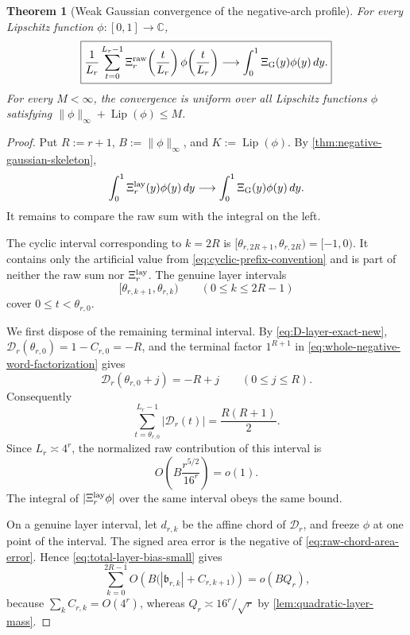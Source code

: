 \documentclass[11pt]{article}
\newtheorem{theorem}{Theorem}[section]
\theoremstyle{definition}
\theoremstyle{remark}
\begin{document}
\begin{theorem}[Weak Gaussian convergence of the negative-arch profile]
\label{thm:weak-gaussian-full-profile}
For every Lipschitz function \(\phi:[0,1]\to\mathbb C\),
\begin{equation}
 \boxed{
 \frac1{L_r}\sum_{t=0}^{L_r-1}
 \Xi_r^{\rm raw}\!\left(\frac{t}{L_r}\right)
 \phi\!\left(\frac{t}{L_r}\right)
 \longrightarrow
 \int_0^1\Xi_{\rm G}(y)\phi(y)\,dy.
 }
 \label{eq:weak-gaussian-test}
\end{equation}
For every \(M<\infty\), the convergence is uniform over all Lipschitz
functions \(\phi\) satisfying
\(\|\phi\|_\infty+\operatorname{Lip}(\phi)\le M\).
\end{theorem}

\begin{proof}
Put \(R:=r+1\), \(B:=\|\phi\|_\infty\), and
\(K:=\operatorname{Lip}(\phi)\).  By
\cref{thm:negative-gaussian-skeleton},
\[
 \int_0^1\Xi_r^{\rm lay}(y)\phi(y)\,dy
 \longrightarrow
 \int_0^1\Xi_{\rm G}(y)\phi(y)\,dy.
\]
It remains to compare the raw sum with the integral on the left.

The cyclic interval corresponding to \(k=2R\) is
\([\theta_{r,2R+1},\theta_{r,2R})=[-1,0)\).  It contains only the artificial
value from \eqref{eq:cyclic-prefix-convention} and is part of neither the
raw sum nor \(\Xi_r^{\rm lay}\).  The genuine layer intervals
\[
 [\theta_{r,k+1},\theta_{r,k})
 \qquad(0\le k\le2R-1)
\]
cover \(0\le t<\theta_{r,0}\).

We first dispose of the remaining terminal interval.  By
\eqref{eq:D-layer-exact-new},
\(\mathscr D_r(\theta_{r,0})=1-C_{r,0}=-R\), and the terminal factor
\(1^{R+1}\) in \eqref{eq:whole-negative-word-factorization} gives
\[
 \mathscr D_r(\theta_{r,0}+j)=-R+j
 \qquad(0\le j\le R).
\]
Consequently
\[
 \sum_{t=\theta_{r,0}}^{L_r-1}|\mathscr D_r(t)|
 =\frac{R(R+1)}2.
\]
Since \(L_r\asymp4^r\), the normalized raw contribution of this interval is
\[
 O\!\left(B\frac{r^{5/2}}{16^r}\right)=o(1).
\]
The integral of \(|\Xi_r^{\rm lay}\phi|\) over the same interval obeys the
same bound.

On a genuine layer interval, let \(d_{r,k}\) be the affine chord of
\(\mathscr D_r\), and freeze \(\phi\) at one point of the interval.  The
signed area error is the negative of
\eqref{eq:raw-chord-area-error}.  Hence
\eqref{eq:total-layer-bias-small} gives
\[
 \sum_{k=0}^{2R-1}
 O\!\left(B\bigl(|\mathfrak b_{r,k}|+C_{r,k+1}\bigr)\right)
 =o(BQ_r),
\]
because \(\sum_kC_{r,k}=O(4^r)\), whereas
\(Q_r\asymp16^r/\sqrt r\) by
\cref{lem:quadratic-layer-mass}.


\end{proof}
\end{document}

